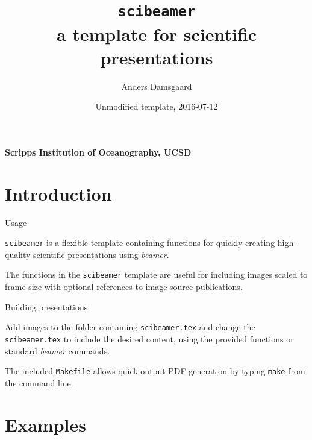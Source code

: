 \documentclass[11pt]{beamer}
\title{\texttt{scibeamer}\\ a template for scientific presentations}
\author[A. Damsgaard]{Anders Damsgaard}
\institute[SIO]{Scripps Institution of Oceanography\\[2mm]
{\small \url{adamsgaard@ucsd.edu}}}
\date{\small Unmodified template, 2016-07-12}
\begin{document}
\begin{frame}[fragile]
  \begin{centering}
    \framesubtitle{Scripps Institution of Oceanography, UCSD}
    \titlepage{}
  \end{centering}
\end{frame}


\section{Introduction}

\begin{frame}{Usage}

    \texttt{scibeamer} is a flexible template containing functions for quickly 
    creating high-quality scientific presentations using \emph{beamer}.

    \vspace{1em}

    The functions in the \texttt{scibeamer} template are useful for including 
    images scaled to frame size with optional references to image source 
    publications.

\end{frame}

\begin{frame}{Building presentations}

    Add images to the folder containing \texttt{scibeamer.tex} and change the 
    \texttt{scibeamer.tex} to include the desired content, using the provided 
    functions or standard \emph{beamer} commands.

    \vspace{1em}

    The included \texttt{Makefile} allows quick output PDF generation by typing 
    \texttt{make} from the command line.

\end{frame}


\section{Examples}



\end{document}
